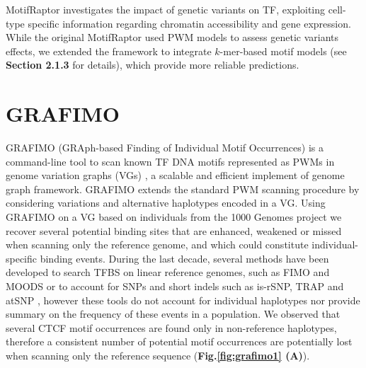 \documentclass[a4paper, titlepage, openright]{book}
\begin{document}
MotifRaptor \citep{yao2021motif} investigates the impact of genetic variants on TF, exploiting cell-type specific information regarding chromatin accessibility and gene expression. While the original MotifRaptor used PWM models to assess genetic variants effects, we extended the framework to integrate $k$-mer-based motif models (see \textbf{Section 2.1.3} for details), which provide more reliable predictions.
\section{GRAFIMO}
GRAFIMO (GRAph-based Finding of Individual Motif Occurrences) \citep{tognon2021grafimo} is a command-line tool to scan known TF DNA motifs represented as PWMs in genome variation graphs (VGs) \citep{garrison2018variation}, a scalable and efficient implement of genome graph framework. GRAFIMO extends the standard PWM scanning procedure by considering variations and alternative haplotypes encoded in a VG. Using GRAFIMO on a VG based on individuals from the 1000 Genomes project \citep{siva20081000} we recover several potential binding sites that are enhanced, weakened or missed when scanning only the reference genome, and which could constitute individual-specific binding events. During the last decade, several methods have been developed to search TFBS on linear reference genomes, such as FIMO \citep{grant2011fimo} and MOODS \citep{korhonen2009moods} or to account for SNPs and short indels such as is-rSNP, TRAP and atSNP \citep{macintyre2010rsnp,thomas2011transcription,zuo2015atsnp}, however these tools do not account for individual haplotypes nor provide summary on the frequency of these events in a population. We observed that several CTCF motif occurrences are found only in non-reference haplotypes, therefore a consistent number of potential motif occurrences are potentially lost when scanning only the reference sequence (\textbf{Fig.\ref{fig:grafimo1} (A)}). 
\end{document}

